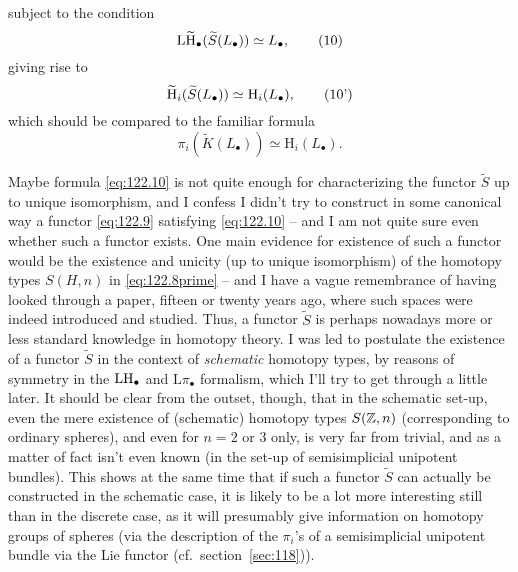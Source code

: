 subject to the condition
\begin{equation}
  \label{eq:122.10}
  \operatorname{L\widetilde H}_\bullet(\widetilde S(L_\bullet)) \simeq L_\bullet,\tag{10}
\end{equation}
giving rise to
\begin{equation}
  \label{eq:122.10prime}
  \operatorname{\widetilde H}_i(\widetilde S(L_\bullet)) \simeq \mathrm H_i(L_\bullet),\tag{10'}
\end{equation}
which should be compared to the familiar formula
\begin{equation}
  \label{eq:122.11}
  \pi_i(\widetilde K(L_\bullet)) \simeq \mathrm H_i(L_\bullet).\tag{11}
\end{equation}

Maybe formula \eqref{eq:122.10} is not quite enough for characterizing
the functor $\widetilde S$ up to unique isomorphism, and I confess I
didn't try to construct in some canonical way a functor
\eqref{eq:122.9} satisfying \eqref{eq:122.10} -- and I am not quite
sure even whether such a functor exists. One main evidence for
existence of such a functor would be the existence and unicity (up to
unique isomorphism) of the homotopy types $S(H,n)$ in
\eqref{eq:122.8prime} -- and I have a vague remembrance of having
looked through a paper, fifteen or twenty years ago, where such spaces
were indeed introduced and studied. Thus, a functor $\widetilde S$ is
perhaps nowadays more or less standard knowledge in
homotopy theory. I was led to postulate the existence of a functor
$\widetilde S$ in the context of \emph{schematic} homotopy types, by
reasons of symmetry in the $\operatorname{LH}_\bullet$ and $\mathrm L\pi_\bullet$
formalism, which I'll try to get through a little later. It should be
clear from the outset, though, that in the schematic set-up, even the
mere existence of (schematic) homotopy types $S({\mathbb{Z}},n)$ (corresponding
to ordinary spheres), and even for $n=2$ or $3$ only, is very far from
trivial, and as a matter of fact isn't even known (in the set-up of
semisimplicial unipotent bundles). This shows at the same time that if
such a functor $\widetilde S$ can actually be constructed in the
schematic case, it is likely to be a lot more interesting still than
in the discrete case, as it will presumably give information on
homotopy groups of spheres (via the description of the $\pi_i$'s of a
semisimplicial unipotent bundle via the Lie functor (cf.\
section~\ref{sec:118})).

